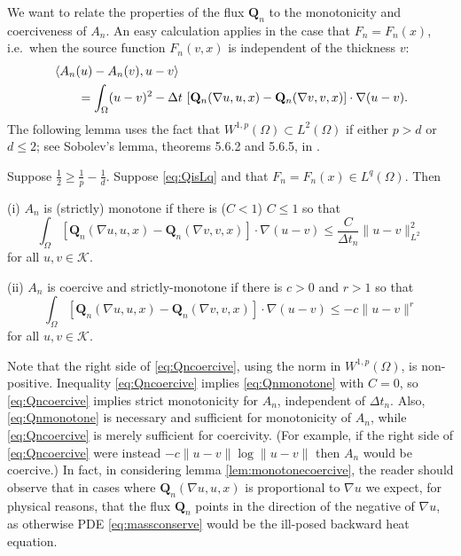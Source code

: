 \documentclass[final,leqno,onefignum,onetabnum]{siamltex1213bueler}
\newcommand\bQ{\mathbf{Q}}
\renewcommand{\grad}{\nabla}
\newcommand{\ip}[2]{\ensuremath{\left<#1,#2\right>}}
\begin{document}
We want to relate the properties of the flux $\bQ_n$ to the monotonicity and coerciveness of $A_n$.  An easy calculation applies in the case that $F_n=F_n(x)$, i.e.~when the source function $F_n(v,x)$ is independent of the thickness $v$:
\begin{align}
   &\ip{A_n(u) - A_n(v)}{u-v}  \label{eq:AtoQcalculation} \\
   &\qquad = \int_\Omega (u-v)^2 - \Delta t\, \left[\bQ_n(\grad u,u,x) - \bQ_n(\grad v,v,x)\right] \cdot \grad(u-v).  \notag
\end{align}
The following lemma uses the fact that $W^{1,p}(\Omega) \subset L^2(\Omega)$ if either $p>d$ or $d\le 2$; see Sobolev's lemma, theorems 5.6.2 and 5.6.5, in \cite{Evans1998}.

\begin{lemma}  \label{lem:monotonecoercive}  Suppose $\frac{1}{2} \ge \frac{1}{p} - \frac{1}{d}$.  Suppose \eqref{eq:QisLq} and that $F_n=F_n(x) \in L^q(\Omega)$.  Then

(i)  $A_n$ is (strictly) monotone if there is ($C<1$) $C\le 1$ so that
\begin{equation}
\int_\Omega \left[\bQ_n(\grad u,u,x) - \bQ_n(\grad v,v,x)\right] \cdot \grad(u-v) \le \frac{C}{\Delta t_n} \|u-v\|_{L^2}^2 \label{eq:Qnmonotone}
\end{equation}
for all $u,v \in \mathcal{K}$.

(ii)  $A_n$ is coercive and strictly-monotone if there is $c>0$ and $r>1$ so that
\begin{equation}
\int_\Omega \left[\bQ_n(\grad u,u,x) - \bQ_n(\grad v,v,x)\right] \cdot \grad(u-v) \le - c \|u-v\|^r \label{eq:Qncoercive}
\end{equation}
for all $u,v \in \mathcal{K}$.
\end{lemma}

Note that the right side of \eqref{eq:Qncoercive}, using the norm in $W^{1,p}(\Omega)$, is non-positive.  Inequality \eqref{eq:Qncoercive} implies \eqref{eq:Qnmonotone} with $C=0$, so \eqref{eq:Qncoercive} implies strict monotonicity for $A_n$, independent of $\Delta t_n$.  Also, \eqref{eq:Qnmonotone} is necessary and sufficient for monotonicity of $A_n$, while \eqref{eq:Qncoercive} is merely sufficient for coercivity.  (For example, if the right side of \eqref{eq:Qncoercive} were instead $- c \|u-v\| \log \|u-v\|$ then $A_n$ would be coercive.)  In fact, in considering lemma \ref{lem:monotonecoercive}, the reader should observe that in cases where $\bQ_n(\grad u,u,x)$ is proportional to $\grad u$ we expect, for physical reasons, that the flux $\bQ_n$ points in the direction of the negative of $\grad u$, as otherwise PDE \eqref{eq:massconserve} would be the ill-posed backward heat equation.
\end{document}
